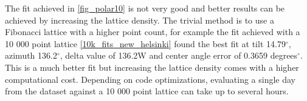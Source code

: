 \begin{figure}[h]
\begin{floatrow}
\end{floatrow}
\end{figure}

\noindent The fit achieved in \ref{fig_polar10} is not very good and better results can be achieved by increasing the lattice density. The trivial method is to use a Fibonacci lattice with a higher point count, for example the fit achieved with a 10 000 point lattice \ref{10k_fits_new_helsinki} found the best fit at tilt 14.79$^\circ$, azimuth 136.2$^\circ$, delta value of 136.2W and center angle error of 0.3659 degrees$^\circ$. This is a much better fit but increasing the lattice density comes with a higher computational cost. Depending on code optimizations, evaluating a single day from the dataset against a 10 000 point lattice can take up to several hours.

